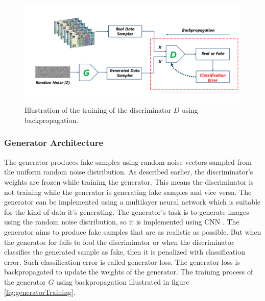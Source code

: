 \begin{figure}[H]
        \begin{center}
	    \includegraphics[scale=0.45]{images/Fundamentals/discriminatorTraining.png}
	    \caption[Illustration of the training of the discriminator $D$ using backpropagation.]{Illustration of the training of the discriminator $D$ using backpropagation.}
	    \label{fig:discriminatorTraining}
	    \end{center}
\end{figure}

\subsubsection{Generator Architecture}\label{TheGeneratorSubSection}


The generator produces fake samples using random noise vectors sampled from the uniform random noise distribution. As described earlier, the discriminator's weights are frozen while training the generator. This means the discriminator is not training while the generator is generating fake samples and vice versa. The generator can be implemented using a multilayer neural network which is suitable for the kind of data it's generating. The generator's task is to generate images using the random noise distribution, so it is implemented using \ac{CNN} \cite{radford2016unsupervised}. The generator aims to produce fake samples that are as realistic as possible. But when the generator for fails to fool the discriminator or when the discriminator classifies the generated sample as fake, then it is penalized with classification error. Such classification error is called generator loss. The generator loss is backpropagated to update the weights of the generator. The training process of the generator $G$ using backpropagation illustrated in figure \ref{fig:generatorTraining}.

